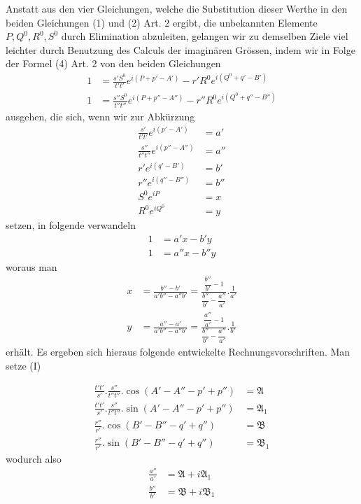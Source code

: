 \par\clearpage
{}
\noindent Anstatt aus den vier Gleichungen, welche die Substitution dieser Werthe in den beiden Gleichungen (1) und (2) Art. 2 ergibt, die unbekannten Elemente $P,Q^0,R^0,S^0$ durch Elimination abzuleiten, gelangen wir zu demselben Ziele viel leichter durch Benutzung des Calculs der imaginären Grössen, indem wir in Folge der Formel (4) Art. 2 von den beiden Gleichungen
\[
\begin{aligned}
1&=\frac{s'S^0}{t't'}e^{i(P+p'-A')}-r'R^0e^{i(Q^0+q'-B')}\\
1&=\frac{s''S^0}{t''t''}e^{i(P+p''-A'')}-r''R^0e^{i(Q^0+q''-B'')}
\end{aligned}
\]
ausgehen, die sich, wenn wir zur Abkürzung
\[
\begin{aligned}
\frac{s'}{t't'}e^{i(p'-A')}&=a'\\
\frac{s''}{t''t''}e^{i(p''-A'')}&=a''\\
r'e^{i(q'-B')}&=b'\\
r''e^{i(q''-B'')}&=b''\\
S^0e^{iP}&=x\\
R^0e^{iQ^0}&=y
\end{aligned}
\]
setzen, in folgende verwandeln
\[
\begin{aligned}
1&=a'x-b'y\\
1&=a''x-b''y
\end{aligned}
\]
woraus man
\[
\begin{aligned}
x&=\frac{b''-b'}{a'b''-a''b'}=\frac{\dfrac{b''}{b'}-1}{\dfrac{b''}{b'}-\dfrac{a''}{a'}}.\frac{1}{a'}\\[1ex]
y&=\frac{a''-a'}{a'b''-a''b'}=\frac{\dfrac{a''}{a'}-1}{\dfrac{b''}{b'}-\dfrac{a''}{a'}}.\frac{1}{b'}
\end{aligned}
\]
erhält. Es ergeben sich hieraus folgende entwickelte Rechnungsvorschriften. Man setze (I)
\par\clearpage
{}
\[
\begin{aligned}
\frac{t't'}{s'}.\frac{s''}{t''t''}.\cos(A'-A''-p'+p'')&=\mathfrak{A}\\
\frac{t't'}{s'}.\frac{s''}{t''t''}.\sin(A'-A''-p'+p'')&=\mathfrak{A}_1\\
\frac{r''}{r'}.\cos(B'-B''-q'+q'')&=\mathfrak{B}\\
\frac{r''}{r'}.\sin(B'-B''-q'+q'')&=\mathfrak{B}_1
\end{aligned}
\]
wodurch also
\[
\begin{aligned}
\frac{a''}{a'}&=\mathfrak{A}+i\mathfrak{A}_1\\
\frac{b''}{b'}&=\mathfrak{B}+i\mathfrak{B}_1
\end{aligned}
\]
